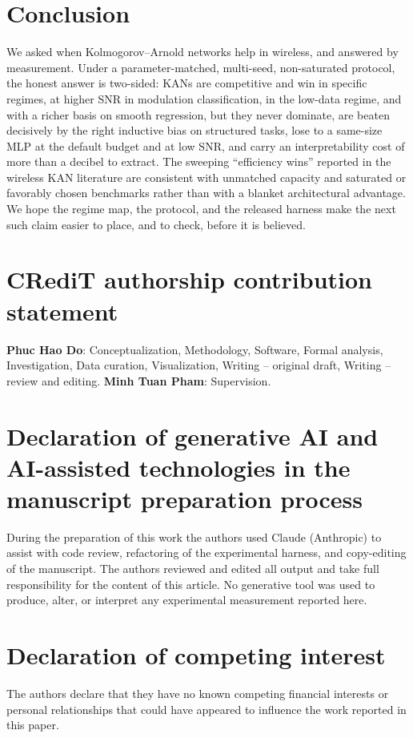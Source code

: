 \documentclass[final,5p,times]{elsarticle}
\begin{document}
\section{Conclusion}\label{sec:concl}
We asked when Kolmogorov--Arnold networks help in wireless, and answered by measurement.
Under a parameter-matched, multi-seed, non-saturated protocol, the honest answer is
two-sided: KANs are competitive and win in specific regimes, at higher SNR in modulation
classification, in the low-data regime, and with a richer basis on smooth regression, but
they never dominate, are beaten decisively by the right inductive bias on structured tasks,
lose to a same-size MLP at the default budget and at low SNR, and carry an interpretability
cost of more than a decibel to extract. The sweeping ``efficiency wins'' reported in the
wireless KAN literature are consistent with unmatched capacity and saturated or favorably
chosen benchmarks rather than with a blanket architectural advantage. We hope the regime
map, the protocol, and the released harness make the next such claim easier to place, and to
check, before it is believed.

\section*{CRediT authorship contribution statement}
\textbf{Phuc Hao Do}: Conceptualization, Methodology, Software, Formal analysis,
Investigation, Data curation, Visualization, Writing -- original draft,
Writing -- review and editing. \textbf{Minh Tuan Pham}: Supervision.

\section*{Declaration of generative AI and AI-assisted technologies in the manuscript
preparation process}
During the preparation of this work the authors used Claude (Anthropic) to assist with
code review, refactoring of the experimental harness, and copy-editing of the manuscript.
The authors reviewed and edited all output and take full responsibility for the content of
this article. No generative tool was used to produce, alter, or interpret any experimental
measurement reported here.

\section*{Declaration of competing interest}
The authors declare that they have no known competing financial interests or personal
relationships that could have appeared to influence the work reported in this paper.
\end{document}
